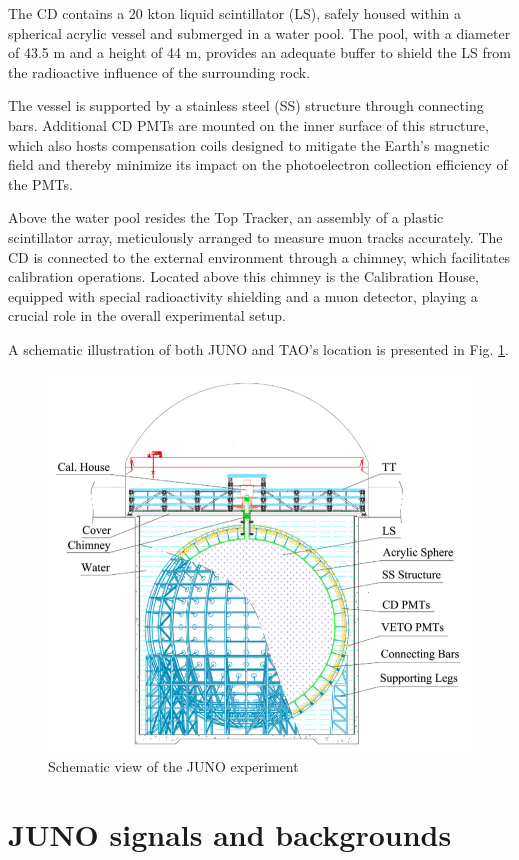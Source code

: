 The CD contains a 20 kton liquid scintillator (LS), safely housed within a spherical acrylic vessel and submerged in a water pool. The pool, with a diameter of 43.5 m and a height of 44 m, provides an adequate buffer to shield the LS from the radioactive influence of the surrounding rock.

The vessel is supported by a stainless steel (SS) structure through connecting bars. Additional CD PMTs are mounted on the inner surface of this structure, which also hosts compensation coils designed to mitigate the Earth's magnetic field and thereby minimize its impact on the photoelectron collection efficiency of the PMTs.

Above the water pool resides the Top Tracker, an assembly of a plastic scintillator array, meticulously arranged to measure muon tracks accurately. The CD is connected to the external environment through a chimney, which facilitates calibration operations. Located above this chimney is the Calibration House, equipped with special radioactivity shielding and a muon detector, playing a crucial role in the overall experimental setup.

A schematic illustration of both JUNO and TAO's location is presented in Fig. \ref{fig:junoschemeexperiment}.


\begin{figure}[h]
	\centering
	\includegraphics[width=0.7\linewidth]{Images/juno_scheme_experiment}
	\caption[JUNO scheme experiment]{Schematic view of the JUNO experiment}
	\label{fig:junoschemeexperiment}
\end{figure}


\section{JUNO signals and backgrounds}


